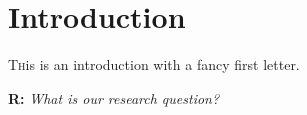 \section{Introduction}
\label{sec:intro}

\lettrine[nindent=0em,lines=3]{T}his is an introduction with a fancy first letter. \blindtext

\begin{displayquote}
    \textbf{R:} \emph{What is our research question?}
\end{displayquote}

\blindtext
